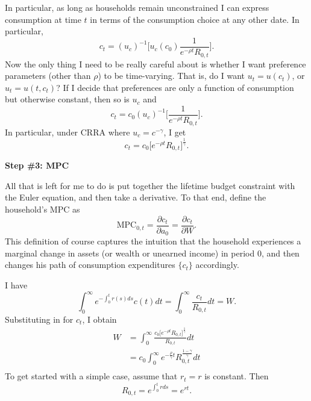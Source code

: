 \documentclass[11pt]{extarticle}
\theoremstyle{plain}
\theoremstyle{definition}
\begin{document}
\vspace{3mm}
\noindent
In particular, as long as households remain unconstrained I can express consumption at time $t$ in terms of the consumption choice at any other date. In particular, 
\begin{equation*}
	c_t = (u_c)^{-1} \bigg[ u_c(c_0) \frac{1 }{e^{-\rho t}R_{0,t}} \bigg].
\end{equation*}
Now the only thing I need to be really careful about is whether I want preference parameters (other than $\rho$) to be time-varying. That is, do I want $u_t = u(c_t)$, or $u_t = u(t, c_t)$? If I decide that preferences are only a function of consumption but otherwise constant, then so is $u_c$ and 
\begin{equation*}
	c_t = c_0 (u_c)^{-1} \bigg[ \frac{1 }{e^{-\rho t}R_{0,t}} \bigg].
\end{equation*}
In particular, under CRRA where $u_c = c^{-\gamma}$, I get 
\begin{equation*}
	c_t = c_0 \bigg[ e^{- \rho t} R_{0,t} \bigg]^\frac{1}{\gamma} .
\end{equation*}



\vspace{5mm}
\noindent
\textbf{Step \#3: MPC}



\vspace{3mm}
\noindent
All that is left for me to do is put together the lifetime budget constraint with the Euler equation, and then take a derivative. To that end, define the household's MPC as 
\begin{equation*}
	\text{MPC}_{0,t} = \frac{\partial c_t}{\partial a_0} = \frac{\partial c_t}{\partial W}.
\end{equation*}
This definition of course captures the intuition that the household experiences a marginal change in assets (or wealth or unearned income) in period $0$, and then changes his path of consumption expenditures $\{ c_t\}$ accordingly. 


I have
\begin{equation*}
	\int_0^\infty e^{- \int_0^t r(s) ds }   c(t) dt = \int_0^\infty \frac{c_t}{R_{0,t}} dt = W.
\end{equation*}
Substituting in for $c_t$, I obtain
\begin{align*}
	W &= \int_0^\infty \frac{c_0 \big[ e^{- \rho t} R_{0,t} \big]^\frac{1}{\gamma} }{R_{0,t}} dt \\
	&= c_0 \int_0^\infty e^{- \frac{\rho}{\gamma} t} R_{0,t}^\frac{1-\gamma}{\gamma} dt \\
\end{align*}
To get started with a simple case, assume that $r_t = r$ is constant. Then 
\begin{equation*}
	R_{0,t} = e^{\int_0^t r ds } = e^{ r t}.
\end{equation*}
\end{document}
